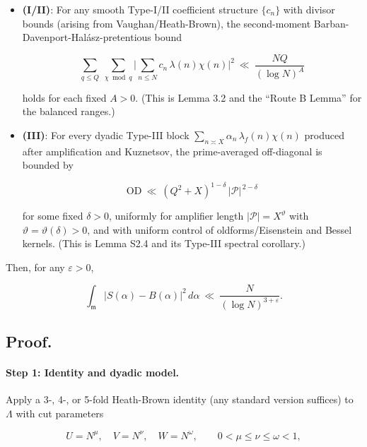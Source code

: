 \documentclass[11pt]{article}
\theoremstyle{definition}
\theoremstyle{remark}
\begin{document}
\begin{itemize}
	\item \textbf{(I/II)}: For any smooth Type-I/II coefficient structure $\{c_n\}$ with divisor bounds (arising from Vaughan/Heath-Brown), the second-moment Barban-Davenport-Halász-pretentious bound

	      \begin{equation}
		      \sum_{q\le Q}\ \sum_{\chi\bmod q}\Big|\sum_{n\le N} c_n\,\lambda(n)\chi(n)\Big|^2
		      \ \ll\ \frac{NQ}{(\log N)^A}
		      \tag{D.1}
	      \end{equation}

	      holds for each fixed $A>0$. (This is Lemma 3.2 and the “Route B Lemma” for the balanced ranges.)

	\item \textbf{(III)}: For every dyadic Type-III block $\sum_{n\asymp X}\alpha_n\,\lambda_f(n)\chi(n)$ produced after amplification and Kuznetsov, the prime-averaged off-diagonal is bounded by

	      \begin{equation}
		      \mathrm{OD}\ \ll\ (Q^2+X)^{1-\delta}\,|\mathcal P|^{\,2-\delta}
		      \tag{D.2}
	      \end{equation}

	      for some fixed $\delta>0$, uniformly for amplifier length $|\mathcal P|=X^\vartheta$ with $\vartheta=\vartheta(\delta)>0$, and with uniform control of oldforms/Eisenstein and Bessel kernels. (This is Lemma S2.4 and its Type-III spectral corollary.)
\end{itemize}

Then, for any $\varepsilon>0$,

$$
	\int_{\mathfrak m}\big|S(\alpha)-B(\alpha)\big|^2\,d\alpha
	\ \ll\ \frac{N}{(\log N)^{3+\varepsilon}}.
$$

\subsection*{Proof.}

\paragraph{Step 1: Identity and dyadic model.}
Apply a 3-, 4-, or 5-fold Heath-Brown identity (any standard version suffices) to $\Lambda$ with cut parameters

$$
	U=N^{\mu},\quad V=N^{\nu},\quad W=N^{\omega},\qquad 0<\mu\le\nu\le\omega<1,
$$
\end{document}
